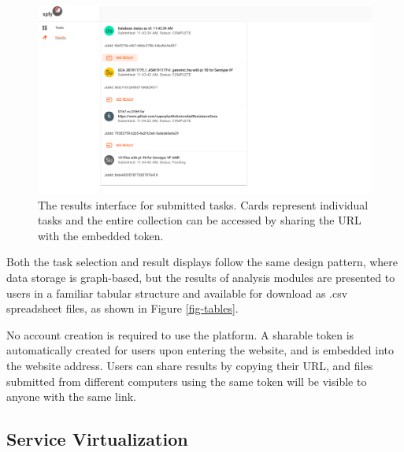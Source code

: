 \documentclass{article}
\begin{document}
\begin{figure}[!htb]
\begin{center}
\includegraphics[width=\textwidth]{images/results.png}
\end{center}
\caption{The results interface for submitted tasks. Cards represent individual tasks and the entire collection can be accessed by sharing the URL with the embedded token.}
\label{fig-results}
\end{figure}

Both the task selection and result displays follow the same design pattern, where data storage is graph-based, but the results of analysis modules are presented to users in a familiar tabular structure and available for download as .csv spreadsheet files, as shown in Figure \ref{fig-tables}.

No account creation is required to use the platform. A sharable token is automatically created for users upon entering the website, and is embedded into the website address. Users can share results by copying their URL, and files submitted from different computers using the same token will be visible to anyone with the same link.

\subsection{Service Virtualization}

\end{document}
